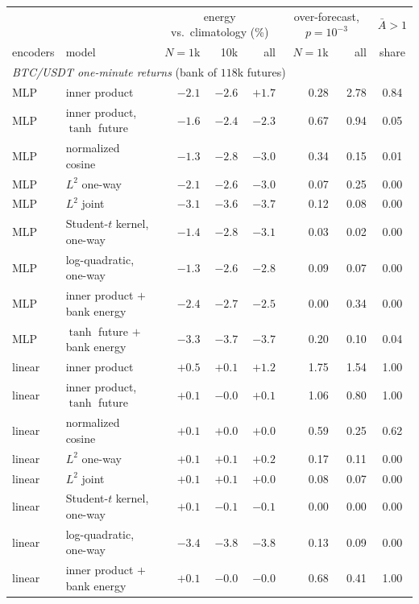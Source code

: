 \documentclass[11pt]{article}
\theoremstyle{plain}
\theoremstyle{definition}
\theoremstyle{remark}
\begin{document}
\begin{table}[ht]
 \centering
 \footnotesize
 \setlength{\tabcolsep}{3.5pt}
 \begin{tabular}{llrrr|rr|c}
  \toprule
           &       & \multicolumn{3}{c|}{energy vs.\ climatology (\%)} & \multicolumn{2}{c|}{over-forecast, $p=10^{-3}$} & $\bar A>1$ \\
  encoders & model & $N=1$k & 10k & all & $N=1$k & all & share \\
  \midrule
  \multicolumn{8}{l}{\emph{BTC/USDT one-minute returns} (bank of $118$k futures)} \\
  MLP & inner product & $-2.1$ & $-2.6$ & $+1.7$ & 0.28 & 2.78 & 0.84 \\
  MLP & inner product, $\tanh$ future & $-1.6$ & $-2.4$ & $-2.3$ & 0.67 & 0.94 & 0.05 \\
  MLP & normalized cosine & $-1.3$ & $-2.8$ & $-3.0$ & 0.34 & 0.15 & 0.01 \\
  MLP & $L^2$ one-way & $-2.1$ & $-2.6$ & $-3.0$ & 0.07 & 0.25 & 0.00 \\
  MLP & $L^2$ joint & $-3.1$ & $-3.6$ & $-3.7$ & 0.12 & 0.08 & 0.00 \\
  MLP & Student-$t$ kernel, one-way & $-1.4$ & $-2.8$ & $-3.1$ & 0.03 & 0.02 & 0.00 \\
  MLP & log-quadratic, one-way & $-1.3$ & $-2.6$ & $-2.8$ & 0.09 & 0.07 & 0.00 \\
  MLP & inner product $+$ bank energy & $-2.4$ & $-2.7$ & $-2.5$ & 0.00 & 0.34 & 0.00 \\
  MLP & $\tanh$ future $+$ bank energy & $-3.3$ & $-3.7$ & $-3.7$ & 0.20 & 0.10 & 0.04 \\
  \midrule
  linear & inner product & $+0.5$ & $+0.1$ & $+1.2$ & 1.75 & 1.54 & 1.00 \\
  linear & inner product, $\tanh$ future & $+0.1$ & $-0.0$ & $+0.1$ & 1.06 & 0.80 & 1.00 \\
  linear & normalized cosine & $+0.1$ & $+0.0$ & $+0.0$ & 0.59 & 0.25 & 0.62 \\
  linear & $L^2$ one-way & $+0.1$ & $+0.1$ & $+0.2$ & 0.17 & 0.11 & 0.00 \\
  linear & $L^2$ joint & $+0.1$ & $+0.1$ & $+0.0$ & 0.08 & 0.07 & 0.00 \\
  linear & Student-$t$ kernel, one-way & $+0.1$ & $-0.1$ & $-0.1$ & 0.00 & 0.00 & 0.00 \\
  linear & log-quadratic, one-way & $-3.4$ & $-3.8$ & $-3.8$ & 0.13 & 0.09 & 0.00 \\
  linear & inner product $+$ bank energy & $+0.1$ & $-0.0$ & $-0.0$ & 0.68 & 0.41 & 1.00 \\

\end{tabular}
\end{table}
\end{document}
